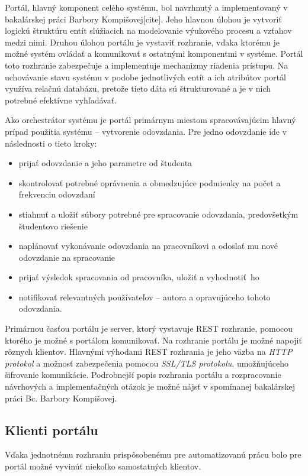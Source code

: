 \documentclass[
  digital, %
  twoside, %
  table,   %
  lof,     %
  lot,     %
]{fithesis3}
\begin{document}
Portál, hlavný komponent celého systému, bol navrhnutý a implementovaný v bakalárskej práci Barbory Kompišovej[cite]. Jeho hlavnou úlohou je vytvoriť logickú štruktúru entít slúžiacich na modelovanie výukového procesu a vzťahov medzi nimi. Druhou úlohou portálu je vystaviť rozhranie, vďaka ktorému je možné systém ovládať a komunikovať s ostatnými komponentmi v systéme. Portál toto rozhranie zabezpečuje a implementuje mechanizmy riadenia prístupu. Na uchovávanie stavu systému v podobe jednotlivých entít a ich atribútov portál využíva relačnú databázu, pretože tieto dáta sú štrukturované a je v nich potrebné efektívne vyhľadávať.

Ako orchestrátor systému je portál primárnym miestom spracovávajúcim hlavný prípad použitia systému -- vytvorenie odovzdania. Pre jedno odovzdanie ide v následnosti o tieto kroky: 
\begin{itemize}
  \item prijať odovzdanie a jeho parametre od študenta
  \item skontrolovať potrebné oprávnenia a obmedzujúce podmienky na počet a frekvenciu odovzdaní
  \item stiahnuť a uložiť súbory potrebné pre spracovanie odovzdania, predovšetkým študentovo riešenie
  \item naplánovať vykonávanie odovzdania na pracovníkovi a odoslať mu nové odovzdanie na spracovanie
  \item prijať výsledok spracovania od pracovníka, uložiť a vyhodnotiť~ho
  \item notifikovať relevantných používateľov --  autora a opravujúceho tohoto odovzdania.
\end{itemize}

Primárnou časťou portálu je server, ktorý vystavuje REST rozhranie, pomocou ktorého je možné s portálom komunikovať. Na rozhranie portálu je možné napojiť rôznych klientov. Hlavnými výhodami REST rozhrania je jeho väzba na \emph{HTTP protokol} a možnosť zabezpečenia pomocou \emph{SSL/TLS protokolu}, umožňujúceho šifrovanie komunikácie. Podrobnejší popis rozhrania portálu a rozpracovanie návrhových a implementačných otázok je možné nájsť v spomínanej bakalárskej práci Bc. Barbory Kompišovej.

\subsection{Klienti portálu}
Vďaka jednotnému rozhraniu prispôsobenému pre automatizovanú prácu bolo pre portál možné vyvinúť niekoľko samostatných klientov. 
\end{document}
